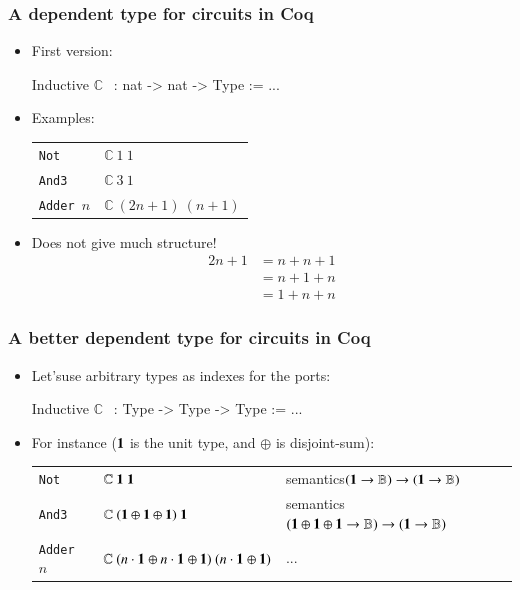 \documentclass[9pt]{beamer}
\begin{document}
\newcommand\circuit[2]{\mathbb{C}~#1~#2}
\begin{frame}[fragile]
  \frametitle{A dependent type for circuits in Coq}

  \begin{itemize}
  \item   First version:
    \begin{coq}
      Inductive $\circuit{}{}$ : nat -> nat -> Type := ...
    \end{coq}
  \item Examples:\\
    \begin{center}
      \begin{tabular}{l@{\quad:\quad}l}
        \texttt{Not} &
        $\circuit{1}{1}$ \\
        
        \texttt{And3} &
        $\circuit{3}{1}$\\
        \texttt{Adder $n$} &  $\circuit{(2n+1)}{(n+1)}$\\
      \end{tabular}
    \end{center}
    \pause
  \item Does not give much structure! 
    \begin{align*}
      2n+1 &= n+n+1 \\
      & = n+1+n \\
      & = 1+n+n
    \end{align*}
  \end{itemize}
  
\end{frame}
\newcommand\unit{{\bf 1}}
\newcommand\zero{{\bf 0}}
\newcommand\bool{\mathbb{B}}
\newcommand\sumn[2]{#2 \cdot \unit_{\tt #1}}


\begin{frame}[fragile]
  \frametitle{A better dependent type for circuits in Coq}
  \begin{itemize}
  \item Let'suse arbitrary types as \alert{indexes} for the ports:
  \begin{coq}
Inductive $\circuit{}{}$ : Type -> Type -> Type := ...      
\end{coq}
\item For instance ($\unit$ is the unit type, and $\oplus$ is
  disjoint-sum):
  \begin{tabular}{l@{\quad:\quad}ll}
    \texttt{Not} &
    $\circuit{\unit}{\unit}$ &
    \alert{semantics$(\unit \to \bool) \to (\unit \to \bool)$} \\
    
    \texttt{And3} &
    $\circuit{(\unit{} \oplus{} \unit{}  \oplus{} \unit{})}{\unit{}}$& 
    \alert{semantics $(\unit \oplus \unit \oplus \unit \to \bool) \to (\unit \to \bool)$} \\
    \texttt{Adder $n$} &  $\circuit{(\sumn{}{n} \oplus \sumn{}{n} \oplus{} \unit{})}{(\sumn{}{n} \oplus \unit)}$     & \alert{...}
  \end{tabular}
\end{itemize}
\pause
{}
\end{frame}
\end{document}

